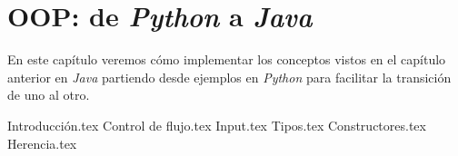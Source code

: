 \chapter{OOP: de \textit{Python} a \textit{Java}}
  En este capítulo veremos cómo implementar los conceptos vistos en el capítulo anterior 
  en \textit{Java} partiendo desde ejemplos en \textit{Python} para facilitar la 
  transición de uno al otro.

  {Introducción.tex}
  {Control de flujo.tex}
  {Input.tex}
  {Tipos.tex}
  {Constructores.tex}
  {Herencia.tex}
%